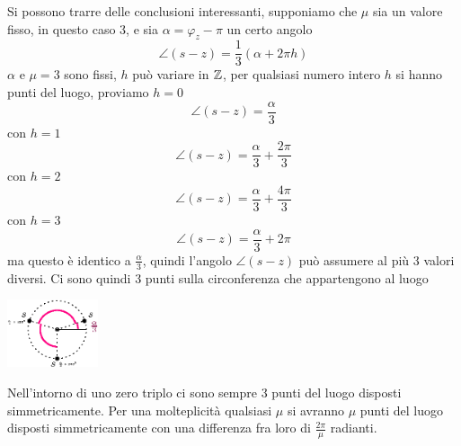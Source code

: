 \documentclass[10pt, letterpaper]{report}
\begin{document}
Si possono trarre delle conclusioni interessanti, supponiamo che $\mu$ sia un valore fisso, in questo caso 3, e sia $\alpha=\varphi_z-\pi$ un certo angolo
$$ \angle(s-z) =\frac{1}{3}(\alpha+2\pi h)$$
$\alpha$ e $\mu=3$ sono fissi, $h$ può variare in ${\mathbb Z}$, per qualsiasi numero intero $h$ si hanno punti del luogo, proviamo $h=0$ 
$$ \angle(s-z) =\frac{\alpha}{3}$$
con $h=1$
$$ \angle(s-z) =\frac{\alpha}{3}+\frac{2\pi}{3}$$
con $h=2$
$$ \angle(s-z) =\frac{\alpha}{3}+\frac{4\pi}{3}$$
con $h=3$
$$ \angle(s-z) =\frac{\alpha}{3}+2\pi$$
ma questo è identico a $\frac{\alpha}{3}$, quindi l'angolo $\angle(s-z)$ può assumere al più 3 valori diversi. Ci sono quindi 3 punti sulla circonferenza che appartengono al luogo\begin{center}
    \includegraphics[width=0.2\textwidth ]{images/zeroTriplo.eps}
\end{center}
Nell'intorno di uno zero triplo ci sono sempre 3 punti del luogo disposti simmetricamente. Per una molteplicità qualsiasi $\mu$ si avranno $\mu$ punti del luogo disposti simmetricamente con una differenza fra loro di $\frac{2\pi}{\mu}$ radianti.\bigskip 
\end{document}
